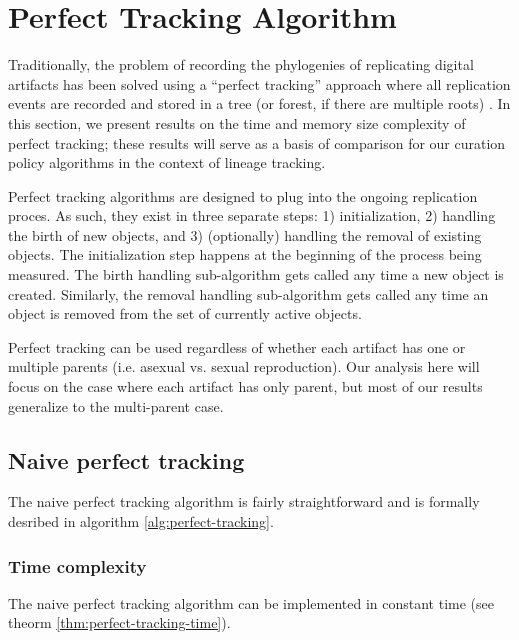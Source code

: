 \section{Perfect Tracking Algorithm} \label{sec:perfect-tracking}

Traditionally, the problem of recording the phylogenies of replicating digital
artifacts has been solved using a ``perfect tracking'' approach where all replication
events are recorded and stored in a tree (or forest, if there are multiple roots) \citep{dolson2023phylotrackpy}.
In this section, we present results on the time and memory size complexity of perfect tracking;
these results will serve as a basis of comparison for our curation policy algorithms in the context
of lineage tracking.

Perfect tracking algorithms are designed to plug into the ongoing replication proces.
As such, they exist in three separate steps: 1) initialization, 2) handling the birth of new objects, and 3) (optionally) handling the removal of existing objects.
The initialization step happens at the beginning of the process being measured.
The birth handling sub-algorithm gets called any time a new object is created.
Similarly, the removal handling sub-algorithm gets called any time an object is removed from the set of currently active objects.

Perfect tracking can be used regardless of whether each artifact has one or multiple parents (i.e. asexual vs. sexual reproduction).
Our analysis here will focus on the case where each artifact has only parent, but most of our results generalize to the multi-parent case.


\subsection{Naive perfect tracking}

The naive perfect tracking algorithm is fairly straightforward and is formally desribed in algorithm \ref{alg:perfect-tracking}.



\subsubsection{Time complexity}

The naive perfect tracking algorithm can be implemented in constant time (see theorm \ref{thm:perfect-tracking-time}).



